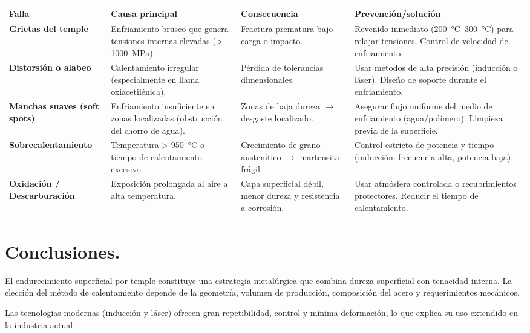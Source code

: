 \documentclass[12pt,a4paper]{article}
\begin{document}
\begin{table}[H]
    \centering
    \scriptsize
    \begin{tabular}{|C{3cm}|C{3.3cm}|C{2.4cm}|C{4.5cm}|}
        \hline
        \textbf{Falla} & \textbf{Causa principal} & \textbf{Consecuencia} & \textbf{Prevención/solución} \\ \hline
        \textbf{Grietas del temple} & Enfriamiento brusco que genera tensiones internas elevadas (> \SI{1000}{\mega\pascal}). & Fractura prematura bajo carga o impacto. & Revenido inmediato (\SIrange[range-units=single, range-phrase={ - }]{200}{300}{\celsius}) para relajar tensiones. Control de velocidad de enfriamiento. \\ \hline
        \textbf{Distorsión o alabeo} & Calentamiento irregular (especialmente en llama oxiacetilénica). & Pérdida de tolerancias dimensionales. & Usar métodos de alta precisión (inducción o láser). Diseño de soporte durante el enfriamiento. \\ \hline
        \textbf{Manchas suaves  (soft spots)} & Enfriamiento insuficiente en zonas localizadas (obstrucción del chorro de agua). & Zonas de baja dureza $\rightarrow$ desgaste localizado. & Asegurar flujo uniforme del medio de enfriamiento (agua/polímero). Limpieza previa de la superficie. \\ \hline
        \textbf{Sobrecalentamiento} & Temperatura > \SI{950}{\celsius} o tiempo de calentamiento excesivo. & Crecimiento de grano austenítico $\rightarrow$ martensita frágil. & Control estricto de potencia y tiempo (inducción: frecuencia alta, potencia baja). \\ \hline
        \textbf{Oxidación / Descarburación} & Exposición prolongada al aire a alta temperatura. & Capa superficial débil, menor dureza y resistencia a corrosión. & Usar atmósfera controlada o recubrimientos protectores. Reducir el tiempo de calentamiento. \\
        \hline
    \end{tabular}
\end{table}

\section{Conclusiones.}

El endurecimiento superficial por temple constituye una estrategia metalúrgica que combina dureza superficial con tenacidad interna. La elección del método de calentamiento depende de la geometría, volumen de producción, composición del acero y requerimientos mecánicos.

Las tecnologías modernas (inducción y láser) ofrecen gran repetibilidad, control y mínima deformación, lo que explica su uso extendido en la industria actual.

\printbibliography[heading=bibnumbered, title={Referencias}]
\end{document}
